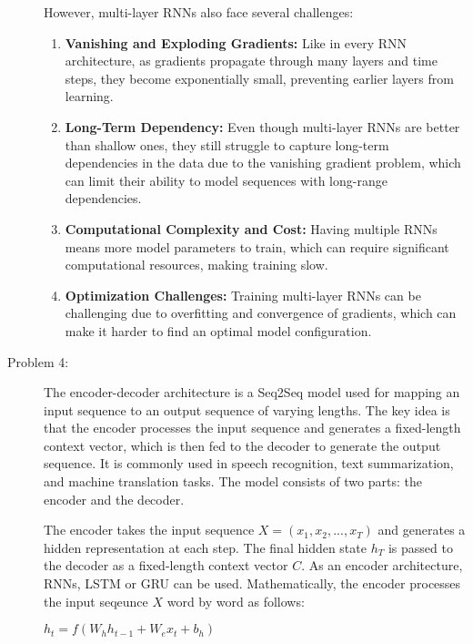 \documentclass[10pt]{article}
\begin{document}
\begin{description}
However, multi-layer RNNs also face several challenges:

\begin{enumerate}
    \item \textbf{Vanishing and Exploding Gradients:} Like in every RNN architecture, as gradients propagate through many layers and time steps, 
    they become exponentially small, preventing earlier layers from learning.
    \item \textbf{Long-Term Dependency:} Even though multi-layer RNNs are better than shallow ones, they still struggle to capture long-term dependencies in the data due to 
    the vanishing gradient problem, which can limit their ability to model sequences with long-range dependencies.
    \item \textbf{Computational Complexity and Cost:} Having multiple RNNs means more model parameters to train, which can require significant computational resources, 
    making training slow.
    \item \textbf{Optimization Challenges:} Training multi-layer RNNs can be challenging due to overfitting and convergence of gradients, which can make it harder to 
    find an optimal model configuration.
\end{enumerate}

\pagebreak

\item[Problem 4:] \hfill %

The encoder-decoder architecture is a Seq2Seq model used for mapping an input sequence to an output sequence of varying lengths.
The key idea is that the encoder processes the input sequence and generates a fixed-length context vector, which is then fed to the decoder to generate the output sequence.
It is commonly used in speech recognition, text summarization, and machine translation tasks.
The model consists of two parts: the encoder and the decoder.

The encoder takes the input sequence $X = (x_1, x_2, ..., x_T)$ and generates a hidden representation at each step.
The final hidden state $h_T$ is passed to the decoder as a fixed-length context vector $C$.
As an encoder architecture, RNNs, LSTM or GRU can be used.
Mathematically, the encoder processes the input seqeunce $X$ word by word as follows:

\begin{center}
    $h_t = f(W_{h}h_{t-1} + W_{e}x_t + b_h)$
\end{center}


\end{description}
\end{document}
